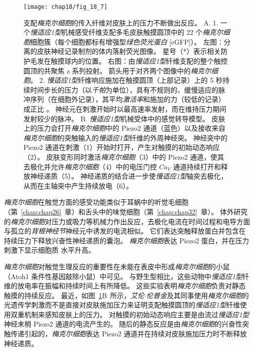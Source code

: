\begin{figure}[htbp]
	\centering
	\texttt{[image: chap18/fig\_18\_7]}
	\caption{支配\textit{梅克尔细胞}的传入纤维对皮肤上的压力不断做出反应。
		A. 1. 一个\textit{慢适应1型}机械感受纤维支配多毛皮肤触摸圆顶中的 22 个\textit{梅克尔细胞}细胞簇（每个细胞都标有增强型\textit{绿色荧光蛋白} [eGFP]）。
		左图：分离的皮肤神经记录制剂的体内落射荧光图像。
		星号（*）表示相关防护毛发在触摸球内的位置。
		右图：由\textit{慢适应1型}纤维支配的整个触控圆顶的共聚焦 z 系列投射。
		箭头用于对齐两个图像中的\textit{梅克尔细胞}。
		2. \textit{慢适应1型}纤维响应施加在触摸圆顶（上部记录）上的 5 秒持续时间步长的压力（以\textit{千帕}为单位），具有不规则的、缓慢适应的脉冲序列（在细胞外记录），其平均\textit{激活率}和施加的力（较低的记录）成正比 。
		神经元在刺激开始时以最高速率发射，而在维持压力期间发射较少的脉冲。
		B. \textit{慢适应1型}机械受体中的感觉转导模型。
		皮肤上的压力会打开\textit{梅克尔细胞}中的 Piezo2 通道（蓝色）以及接收来自\textit{梅克尔细胞}的突触输入的\textit{慢适应1型}纤维的外周神经突。
		神经突中的 Piezo2 通道在刺激（1）开始时打开，产生对触摸的初始动态响应（2）。
		皮肤变形同时激活\textit{梅克尔细胞}（3）中的 Piezo2 通道，使其去极化并允许\textit{梅克尔细胞}（4）中的电压门控 $Ca_V$ 通道持续打开和释放神经递质（5）。
		神经递质的结合进一步使\textit{慢适应1型}轴突去极化，从而在主轴突中产生持续放电（6）\cite{maksimovic2014epidermal}。}
	\label{fig:18_7}
\end{figure}


\textit{梅克尔细胞}在触觉方面的感受功能类似于耳蜗中的听觉毛细胞（第~\ref{chap:chap26}~章）和舌头中的味觉细胞（第~\ref{chap:chap32}~章）。
体外研究的\textit{梅克尔细胞}对压力或吸力等机械力作出反应，去极化电流在时间过程和电导方面与孤立的\textit{背根神经节}神经元中诱发的电流相似。
它们表达突触释放蛋白并包含在持续压力下释放兴奋性神经递质的囊泡。
\textit{梅克尔细胞}表达 Piezo2 蛋白，并在压力刺激下显示细胞质  水平升高。


\textit{梅克尔细胞}对触觉生理反应的重要性在未能在表皮中形成\textit{梅克尔细胞}的小鼠（Atoh1 条件性基因敲除小鼠）中可见。
与野生型相比，这些动物中\textit{慢适应1型}纤维的放电率在振幅和持续时间上有所降低。
这些实验表明\textit{梅克尔细胞}负责对静态触摸的持续反应。 
最近，如图~\ref{fig:18_7}B~所示，\textit{艾伦$\cdot$伦普金}及其同事使用\textit{梅克尔细胞}的光遗传学刺激而不是直接对皮肤施加压力来证明支配触摸圆顶的\textit{慢适应1型}纤维使用双重机制来感知皮肤上的压力。
对触摸的初始动态响应主要是由流过\textit{慢适应1型}神经末梢 Piezo2 通道的电流产生的。
随后的静态反应是由\textit{梅克尔细胞}的兴奋性突触传递引起的，\textit{梅克尔细胞}表达 Piezo2 通道并在持续对皮肤施加压力时不断释放神经递质。


